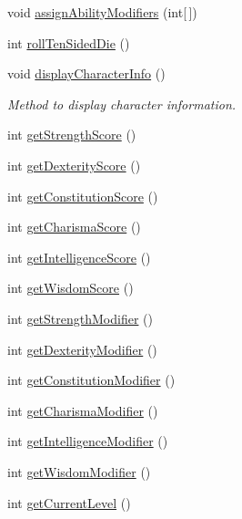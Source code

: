 \begin{DoxyCompactItemize}
void \hyperlink{class_character_a233f495f8092c80cf1951fd075e77ca7}{assign\+Ability\+Modifiers} (int\mbox{[}$\,$\mbox{]})
\item 
int \hyperlink{class_character_a6ab4e58439f6c394dc79f6a23440ef70}{roll\+Ten\+Sided\+Die} ()
\item 
\hypertarget{class_character_a0f993af09d2137001b12ab7b7415a55b}{}\label{class_character_a0f993af09d2137001b12ab7b7415a55b} 
void \hyperlink{class_character_a0f993af09d2137001b12ab7b7415a55b}{display\+Character\+Info} ()
\begin{DoxyCompactList}\small\item\em Method to display character information. \end{DoxyCompactList}\item 
int \hyperlink{class_character_aaaa0856b0bdcbc38c16ba5117df34ee8}{get\+Strength\+Score} ()
\item 
int \hyperlink{class_character_ac83cb6a4ea280a1e99418af81c4bae6c}{get\+Dexterity\+Score} ()
\item 
int \hyperlink{class_character_abbcc6a78fba81fa02add688b94c06376}{get\+Constitution\+Score} ()
\item 
int \hyperlink{class_character_a359c787d436784878e1f8650ddae3c35}{get\+Charisma\+Score} ()
\item 
int \hyperlink{class_character_a515aa3b9303281674dc82ad7d59e9337}{get\+Intelligence\+Score} ()
\item 
int \hyperlink{class_character_a07a2c6534ea013efc290aab432c11011}{get\+Wisdom\+Score} ()
\item 
int \hyperlink{class_character_aa0193d35d813ff170e5e3fbdcf259b8c}{get\+Strength\+Modifier} ()
\item 
int \hyperlink{class_character_ab4732b634d516b397142462b33e05782}{get\+Dexterity\+Modifier} ()
\item 
int \hyperlink{class_character_a61dd2cf1181a46ddecfdc8dede6fa732}{get\+Constitution\+Modifier} ()
\item 
int \hyperlink{class_character_a8b0adc0c65045b78e810fe436c636f4c}{get\+Charisma\+Modifier} ()
\item 
int \hyperlink{class_character_a562aa6723aba380cbddcf7467b921afb}{get\+Intelligence\+Modifier} ()
\item 
int \hyperlink{class_character_a860985777ed1f3f4bb5e4917f052afbd}{get\+Wisdom\+Modifier} ()
\item 
int \hyperlink{class_character_a9cf4ab6c7c066d38566773f946b64442}{get\+Current\+Level} ()
\item 

\end{DoxyCompactItemize}
